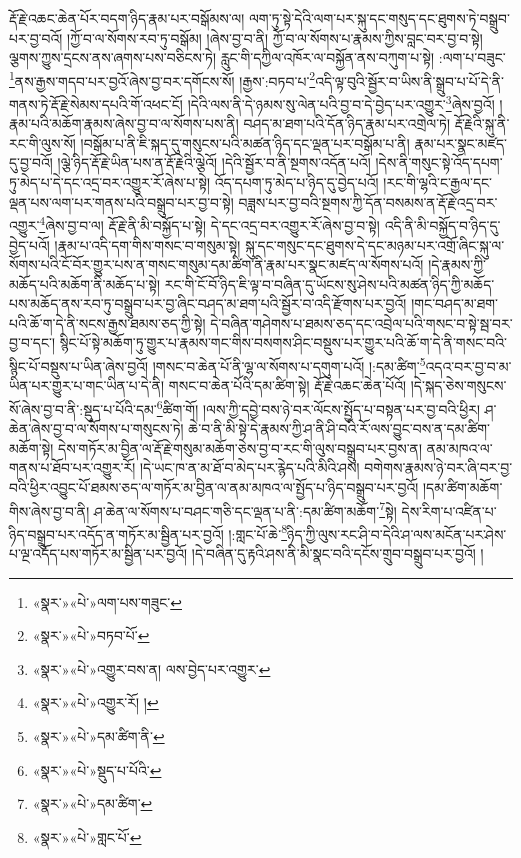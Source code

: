 རྡོ་རྗེ་འཆང་ཆེན་པོར་བདག་ཉིད་རྣམ་པར་བསྒོམས་ལ། ལག་ཏུ་སྟེ་དེའི་ལག་པར་སྐུ་དང་གསུད་དང་ཐུགས་ཏེ་བསྒྲུབ་པར་བྱ་བའོ། །ཀྱོ་བ་ལ་སོགས་རབ་ཏུ་བསྒོམ། །ཞེས་བྱ་བ་ནི། ཀྱོ་བ་ལ་སོགས་པ་རྣམས་ཀྱིས་བླང་བར་བྱ་བ་སྟེ། ལྕགས་ཀྱུས་དྲངས་ནས་ཞགས་པས་བཅིངས་ཏེ། རླུང་གི་དཀྱིལ་འཁོར་ལ་བསྐྱོན་ནས་བཀུག་པ་སྟེ། :ལག་པ་བཟུང་\footnote{«སྣར་»«པེ་»ལག་པས་གཟུང་}ནས་རྒྱས་གདབ་པར་བྱའོ་ཞེས་བྱ་བར་དགོངས་སོ། །རྒྱས་:བཏབ་པ་\footnote{«སྣར་»«པེ་»བཏབ་པོ་}འདི་ལྟ་བུའི་སྦྱོར་བ་ཡིས་ནི་སྒྲུབ་པ་པོ་དེ་ནི་གནས་ཏེ་རྡོ་རྗེ་སེམས་དཔའི་གོ་འཕང་ངོ། །དེའི་ལས་ནི་དེ་ཉམས་སུ་ལེན་པའི་བྱ་བ་དེ་བྱེད་པར་འགྱུར་\footnote{«སྣར་»«པེ་»འགྱུར་བས་ན། ལས་བྱེད་པར་འགྱུར་}ཞེས་བྱའོ། །རྣམ་པའི་མཆོག་རྣམས་ཞེས་བྱ་བ་ལ་སོགས་པས་ནི། བཤད་མ་ཐག་པའི་དོན་ཉིད་རྣམ་པར་འགྲེལ་ཏེ། རྡོ་རྗེའི་སྐུ་ནི་རང་གི་ལུས་སོ། །བསྒོམ་པ་ནི་ཇི་སྐད་དུ་གསུངས་པའི་མཚན་ཉིད་དང་ལྡན་པར་བསྒོམ་པ་ནི། རྣམ་པར་སྣང་མཛད་དུ་བྱ་བའོ། །ལྕེ་ཉིད་རྡོ་རྗེ་ཡིན་པས་ན་རྡོ་རྗེའི་ལྕེའོ། །དེའི་སྦྱོར་བ་ནི་སྔགས་འདོན་པའོ། །དེས་ནི་གསུང་སྟེ་འོད་དཔག་ཏུ་མེད་པ་དེ་དང་འདྲ་བར་འགྱུར་རོ་ཞེས་པ་སྟེ། འོད་དཔག་ཏུ་མེད་པ་ཉིད་དུ་བྱེད་པའོ། །རང་གི་ལྷའི་ང་རྒྱལ་དང་ལྡན་པས་ལག་པར་གནས་པའི་བསྒྲུབ་པར་བྱ་བ་སྟེ། བཟླས་པར་བྱ་བའི་སྔགས་ཀྱི་དོན་བསམས་ན་རྡོ་རྗེ་འདྲ་བར་འགྱུར་\footnote{«སྣར་»«པེ་»འགྱུར་རོ། །}ཞེས་བྱ་བ་ལ། རྡོ་རྗེ་ནི་མི་བསྐྱོད་པ་སྟེ། དེ་དང་འདྲ་བར་འགྱུར་རོ་ཞེས་བྱ་བ་སྟེ། འདི་ནི་མི་བསྐྱོད་བ་ཉིད་དུ་བྱེད་པའོ། །རྣམ་པ་འདི་དག་གིས་གསང་བ་གསུམ་སྟེ། སྐུ་དང་གསུང་དང་ཐུགས་དེ་དང་མཉམ་པར་འགྲོ་ཞིང་སྐུ་ལ་སོགས་པའི་ངོ་བོར་གྱུར་པས་ན་གསང་གསུམ་དམ་ཚིག་ནི་རྣམ་པར་སྣང་མཛད་ལ་སོགས་པའོ། །དེ་རྣམས་ཀྱི་མཆོད་པའི་མཆོག་ནི་མཆོད་པ་སྟེ། རང་གི་ངོ་བོ་ཉིད་ཇི་ལྟ་བ་བཞིན་དུ་ཡོངས་སུ་ཤེས་པའི་མཚན་ཉིད་ཀྱི་མཆོད་པས་མཆོད་ནས་རབ་ཏུ་བསྒྲུབ་པར་བྱ་ཞིང་བཤད་མ་ཐག་པའི་སྦྱོར་བ་འདི་རྫོགས་པར་བྱའོ། །གང་བཤད་མ་ཐག་པའི་ཆོ་ག་དེ་ནི་སངས་རྒྱས་ཐམས་ཅད་ཀྱི་སྟེ། དེ་བཞིན་གཤེགས་པ་ཐམས་ཅད་དང་འབྲེལ་པའི་གསང་བ་སྟེ་སྦ་བར་བྱ་བ་དང་། སྙིང་པོ་སྟེ་མཆོག་ཏུ་གྱུར་པ་རྣམས་གང་གིས་བསགས་ཤིང་བསྡུས་པར་གྱུར་པའི་ཆོ་ག་དེ་ནི་གསང་བའི་སྙིང་པོ་བསྡུས་པ་ཡིན་ཞེས་བྱའོ། །གསང་བ་ཆེན་པོ་ནི་ལྷ་ལ་སོགས་པ་དགུག་པའོ། །:དམ་ཚིག་\footnote{«སྣར་»«པེ་»དམ་ཚིག་ནི་}འདའ་བར་བྱ་བ་མ་ཡིན་པར་གྱུར་པ་གང་ཡིན་པ་དེ་ནི། གསང་བ་ཆེན་པོའི་དམ་ཚིག་སྟེ། རྡོ་རྗེ་འཆང་ཆེན་པོའོ། །དེ་སྐད་ཅེས་གསུངས་སོ་ཞེས་བྱ་བ་ནི་:སྡུད་པ་པོའི་དམ་\footnote{«སྣར་»«པེ་»སྡུད་པ་པོའི་}ཚིག་གོ། །ལས་ཀྱི་དབྱེ་བས་ཉེ་བར་ལོངས་སྤྱོད་པ་བསྟན་པར་བྱ་བའི་ཕྱིར། ཤ་ཆེན་ཞེས་བྱ་བ་ལ་སོགས་པ་གསུངས་ཏེ། ཆེ་བ་ནི་མི་སྟེ་དེ་རྣམས་ཀྱི་ཤ་ནི་ཤི་བའི་རོ་ལས་བྱུང་བས་ན་དམ་ཚིག་མཆོག་སྟེ། དེས་གཏོར་མ་བྱིན་ལ་རྡོ་རྗེ་གསུམ་མཆོག་ཅེས་བྱ་བ་རང་གི་ལུས་བསྒྲུབ་པར་བྱས་ན། ནམ་མཁའ་ལ་གནས་པ་ཐོབ་པར་འགྱུར་རོ། །དེ་ཡང་ཁ་ན་མ་ཐོ་བ་མེད་པར་རྙེད་པའི་མིའི་ཤས། བགེགས་རྣམས་ཉེ་བར་ཞི་བར་བྱ་བའི་ཕྱིར་འབྱུང་པོ་ཐམས་ཅད་ལ་གཏོར་མ་བྱིན་ལ་ནམ་མཁའ་ལ་སྤྱོད་པ་ཉིད་བསྒྲུབ་པར་བྱའོ། །དམ་ཚིག་མཆོག་གིས་ཞེས་བྱ་བ་ནི། ཤ་ཆེན་ལ་སོགས་པ་བཤང་གཅི་དང་ལྡན་པ་ནི་:དམ་ཚིག་མཆོག་\footnote{«སྣར་»«པེ་»དམ་ཚིག་}སྟེ། དེས་རིག་པ་འཛིན་པ་ཉིད་བསྒྲུབ་པར་འདོད་ན་གཏོར་མ་སྦྱིན་པར་བྱའོ། །:གླང་པོ་ཆེ་\footnote{«སྣར་»«པེ་»གླང་པོ་}ཉིད་ཀྱི་ལུས་རང་ཤི་བ་དེའི་ཤ་ལས་མངོན་པར་ཤེས་པ་ལྔ་འདོད་པས་གཏོར་མ་སྦྱིན་པར་བྱའོ། །དེ་བཞིན་དུ་རྟའི་ཤས་ནི་མི་སྣང་བའི་དངོས་གྲུབ་བསྒྲུབ་པར་བྱའོ། །
